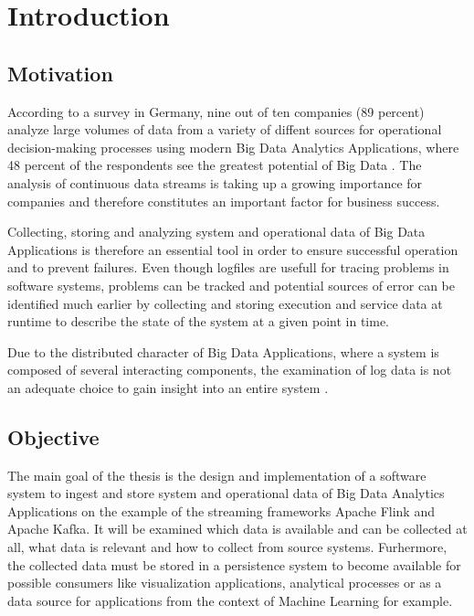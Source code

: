 \chapter{Introduction}

\section{Motivation}
According to a survey in Germany, nine out of ten companies (89 percent) analyze large
volumes of data from a variety of diffent sources for operational decision-making processes
using modern Big Data Analytics Applications, where 48 percent of the respondents see
the greatest potential of Big Data \cite{Bitk14}. The analysis of continuous data streams is
taking up a growing importance for companies and therefore constitutes an important
factor for business success.

Collecting, storing and analyzing system and operational data of Big Data Applications is
therefore an essential tool in order to ensure successful operation and to prevent failures.
Even though logfiles are usefull for tracing problems in software systems, problems can
be tracked and potential sources of error can be identified much earlier by collecting and
storing execution and service data at runtime to describe the state of the system at a
given point in time.

Due to the distributed character of Big Data Applications, where a system is composed
of several interacting components, the examination of log data is not an adequate choice
to gain insight into an entire system \cite{VanL14}.


\section{Objective}

The main goal of the thesis is the design and implementation of a software system to ingest
and  store system and operational data of Big Data Analytics Applications on the example
of the streaming frameworks Apache Flink and Apache Kafka. It will be examined which
data is available and can be collected at all, what data is relevant and how to collect
from source systems. Furhermore, the collected data must be stored in a persistence system
to become available for possible consumers like visualization applications, analytical processes
or as a data source for applications from the context of Machine Learning for example.

